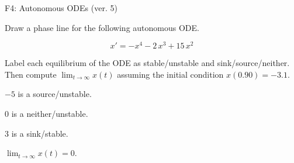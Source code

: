 \begin{exercise}
  \begin{exerciseTitle}F4: Autonomous ODEs (ver. 5)\end{exerciseTitle}
  \begin{exerciseStatement}
    

      Draw a phase line for the following 
      autonomous ODE.
    

    
\[x'= -x^{4} - 2 \, x^{3} + 15 \, x^{2}\]

    

      Label each equilibrium of the ODE
      as stable/unstable and sink/source/neither.
      Then compute \(\lim_{t\to\infty}x(t)\)
      assuming the initial condition
      \(x( 0.90 )= -3.1\).
    

  \end{exerciseStatement}
  \begin{exerciseAnswer}
    

      \(-5\) is a source/unstable.
      
        \(0\) is a neither/unstable.
      
      \(3\) is a sink/stable.
    

    

      \(\lim_{t\to\infty}x(t)=0\).
    

  \end{exerciseAnswer}
\end{exercise}